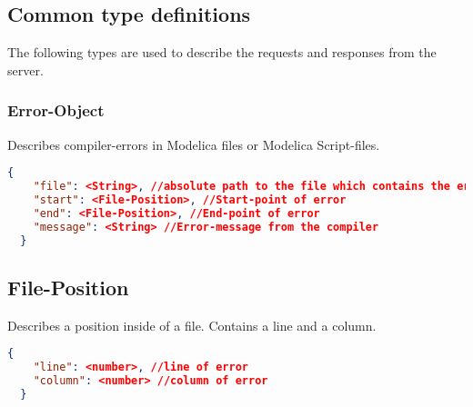 \subsection{Common type definitions}
The following types are used to describe the requests and responses
from the server.

\subsubsection{Error-Object}
Describes compiler-errors in Modelica files or Modelica Script-files.
\newline{}
  \begin{lstlisting}[basicstyle=\small,language=json]
  {
    "file": <String>, //absolute path to the file which contains the error
    "start": <File-Position>, //Start-point of error
    "end": <File-Position>, //End-point of error
    "message": <String> //Error-message from the compiler
  }
  \end{lstlisting}

\subsection{File-Position}
Describes a position inside of a file. Contains a
line and a column.
\newline{}
  \begin{lstlisting}[basicstyle=\small,language=json]
  {
    "line": <number>, //line of error
    "column": <number> //column of error
  }
  \end{lstlisting}
